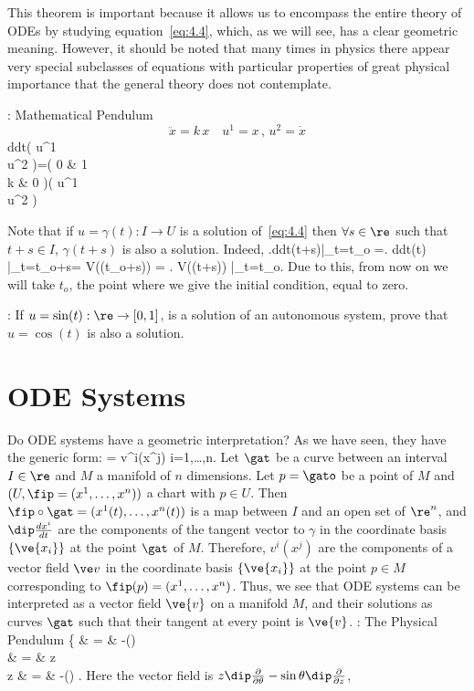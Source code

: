 This theorem is important because it allows us to encompass the entire theory
of ODEs by studying equation~\ref{eq:4.4}, 
which, as we will see, has a clear geometric meaning. 
However, it should be noted that many times in physics
there appear very special subclasses of equations with particular properties
of great physical importance that the general theory does not contemplate.

\ejem: Mathematical Pendulum
$$ \ddot x=k\,x \,\,\,\,\,\,u^1=x\,,\,u^2=\dot x$$
\beq \frac d{dt}\left(
                 u^1 \\ u^2
                 \earr \right)=\left(
                                0 & 1\\
                                k & 0
                                \earr\right)\left(
                                              u^1 \\ u^2
                                              \earr\right)
\eeq 

\espa
Note that if $u = \gamma(t): I \rightarrow U $ is a solution of~\ref{eq:4.4}
then $\forall s\in \re $ such that $t+s \in I$, $\gamma(t+s)$ is also
a solution. Indeed,
\beq
\left.\frac d{dt}\gamma(t+s)\right|_{t=t_o} =\left. \frac d{dt}\gamma(t) 
\right|_{t=t_o+s}= V(\gamma(t_o+s)) = \left. V(\gamma(t+s)) \right|_{t=t_o}.
\eeq
Due to this, from now on we will take $t_o$, the point where we give 
the initial condition, equal to zero.

\ejer:
If $u=\sin(t):\re \rightarrow [0,1]$, is a solution of an autonomous system, 
prove that $u=\cos(t)$ is also a solution.



\section{ODE Systems}

Do ODE systems have a geometric interpretation?
As we have seen, they have the generic form:
\beq
{} = v^i(x^j)\;\;\;\;\;\;\;\;\;\;\; i=1,\ldots,n.
\eeq
Let $\gat$ be a curve between an interval $I\in \re$ and $M$ a manifold of
$n$ dimensions. Let $p=\gato$ be a point of $M$ and
$(U,\fip=(x^1,\ldots,x^n))$ a chart with $p\in U$. Then
$\fip\circ\gat=(x^1(t) ,\ldots,x^n(t))$ is a map between $I$ and an
open set of $\re^n$, and $\dip\frac{dx^i}{dt}$ are the components of the
tangent vector to $\gamma$ in the coordinate basis $\{\ve{x_i}\}$ at the point
$\gat$ of $M$. Therefore, $v^i(x^j)$ are the components of a
vector field $\ve v$ in the coordinate basis $\{\ve{x_i}\}$ at the point
$p\in M$ corresponding to $\fip(p)=(x^1,\ldots,x^n)$. Thus, we see that
ODE systems can be interpreted as a vector field $\ve{v}$ on a manifold $M$, and their solutions as curves $\gat $ 
such that their tangent at every point is $\ve{v}$. 
\espa
\noi
\ejem: The Physical Pendulum
\beq
\left\{
   \ddot\theta  & = & -\sin(\theta) \;\;\;\; \\
   \dot \theta & = & z  \\
   \dot z & = & -\sin(\theta) 
   \earr\right.
\eeq
\noi
Here the vector field is $z\dip\frac{\partial}{\partial\theta} -
\sin \theta \dip\frac{\partial}{\partial z}$,


